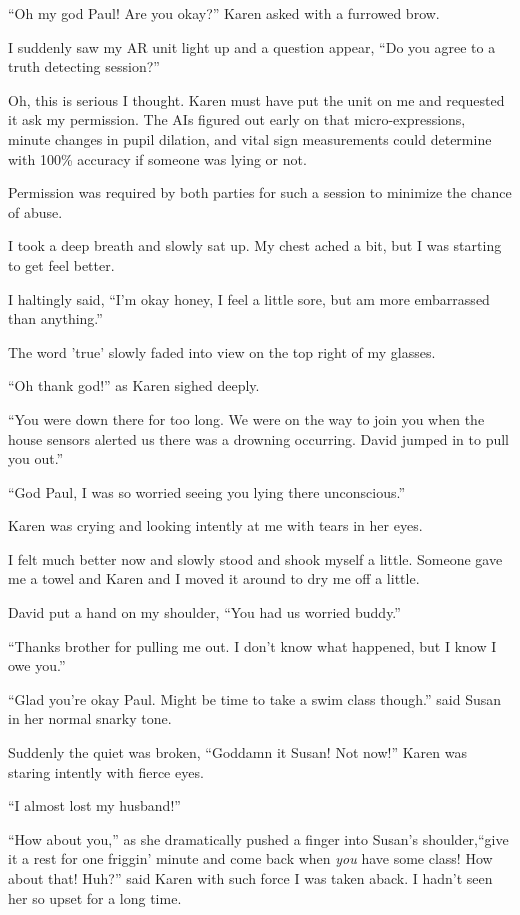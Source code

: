 ``Oh my god Paul! Are you okay?'' Karen asked with a furrowed
brow.

I suddenly saw my AR unit light up and a question appear, ``Do
you agree to a truth detecting session?''

Oh, this is serious I thought. Karen must have put the unit on
me and requested it ask my permission. The AIs figured out early
on that micro-expressions, minute changes in pupil
dilation, and vital sign measurements could determine with
100\% accuracy if someone was lying or not.

Permission was required by both parties for such a session to
minimize the chance of abuse.

I took a deep breath and slowly sat up. My chest ached a bit, but
I was starting to get feel better.

I haltingly said, ``I'm okay honey, I feel a little sore, but am
more embarrassed than anything.''

The word 'true' slowly faded into view on the top right of
my glasses.

``Oh thank god!'' as Karen sighed deeply.

``You were down there for too long. We were on the way to join
you when the house sensors alerted us there was a drowning
occurring. David jumped in to pull you out.''

``God Paul, I was so worried seeing you lying there
unconscious.''

Karen was crying and looking intently at me with tears in her
eyes.

I felt much better now and slowly stood and shook myself a
little. Someone gave me a towel and Karen and I moved it around
to dry me off a little.

David put a hand on my shoulder, ``You had us worried buddy.''

``Thanks brother for pulling me out. I don't know what
happened, but I know I owe you.''

``Glad you're okay Paul. Might be time to take a swim class
though.'' said Susan in her normal snarky tone.

Suddenly the quiet was broken, ``Goddamn it Susan! Not now!''
Karen was staring intently with fierce eyes.

``I almost lost my husband!''

``How about you,'' as she dramatically pushed a finger into
Susan's shoulder,``give it a rest for one friggin' minute and
come back when \emph{you} have some class! How about that!
Huh?'' said Karen with such force I was taken aback. I hadn't
seen her so upset for a long time.


